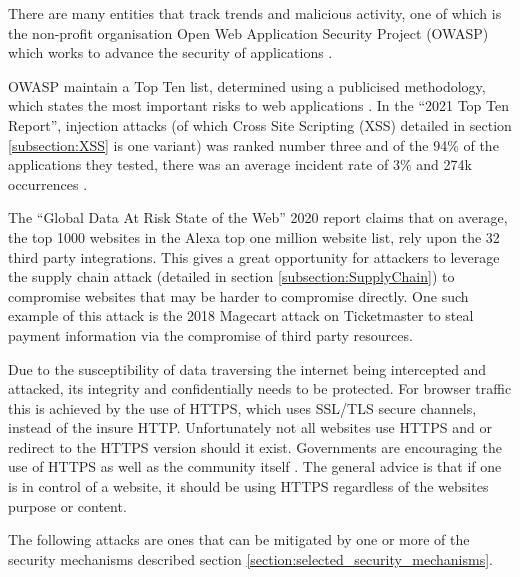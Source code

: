 \documentclass{mscreport}
\begin{document}
\vspace{0.3cm} \noindent
There are many entities that track trends and malicious activity, one of which is the non-profit organisation Open Web Application Security Project (OWASP) which works to advance the security of applications \cite{noauthor_undated-ta,Kellezi2021-nd}.

\vspace{0.3cm} \noindent
OWASP maintain a Top Ten list, determined using a publicised methodology, which states the most important risks to web applications \cite{Kellezi2021-nd,noauthor_undated-kz}. In the ``2021 Top Ten Report'', injection attacks (of which Cross Site Scripting (XSS) detailed in section \ref{subsection:XSS} is one variant) was ranked number three and of the 94\% of the applications they tested, there was an average incident rate of 3\% and 274k occurrences \cite{noauthor_undated-gt}.

\vspace{0.3cm} \noindent
The ``Global Data At Risk State of the Web'' 2020 report \cite{Tala_Security2020-ee} claims that on average, the top 1000 websites in the Alexa top one million website list, rely upon the 32 third party integrations. This gives a great opportunity for attackers to leverage the supply chain attack (detailed in section \ref{subsection:SupplyChain}) to compromise websites that may be harder to compromise directly. One such example of this attack is the 2018 Magecart attack on Ticketmaster \cite{Herman2019-zb} to steal payment information via the compromise of third party resources.

\vspace{0.3cm} \noindent
Due to the susceptibility of data traversing the internet being intercepted and attacked, its integrity and confidentially needs to be protected. For browser traffic this is achieved by the use of HTTPS, which uses SSL/TLS secure channels, instead of the insure HTTP. Unfortunately not all websites use HTTPS and or redirect to the HTTPS version should it exist. Governments are encouraging the use of HTTPS \cite{noauthor_undated-oz} as well as the community itself \cite{noauthor_undated-xk}. The general advice is that if one is in control of a website, it should be using HTTPS regardless of the websites purpose or content. 

\vspace{0.3cm} \noindent
The following attacks are ones that can be mitigated by one or more of the security mechanisms described section \ref{section:selected_security_mechanisms}.
\end{document}
